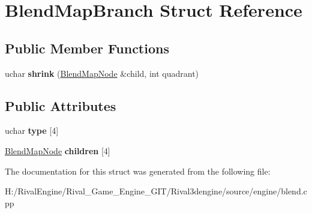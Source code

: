 \hypertarget{struct_blend_map_branch}{}\section{Blend\+Map\+Branch Struct Reference}
\label{struct_blend_map_branch}
\subsection*{Public Member Functions}
\begin{DoxyCompactItemize}
\item 
\mbox{\label{struct_blend_map_branch_a75f4b2252539a7d66896ecec864f5d8d}} 
uchar {\bfseries shrink} (\hyperlink{struct_blend_map_node}{Blend\+Map\+Node} \&child, int quadrant)
\end{DoxyCompactItemize}
\subsection*{Public Attributes}
\begin{DoxyCompactItemize}
\item 
\mbox{\label{struct_blend_map_branch_a93c415f30e5049732ca8eea9b0b1d60b}} 
uchar {\bfseries type} \mbox{[}4\mbox{]}
\item 
\mbox{\label{struct_blend_map_branch_af04ac5df68c681d57889e09b2518bf4b}} 
\hyperlink{struct_blend_map_node}{Blend\+Map\+Node} {\bfseries children} \mbox{[}4\mbox{]}
\end{DoxyCompactItemize}


The documentation for this struct was generated from the following file\+:\begin{DoxyCompactItemize}
\item 
H\+:/\+Rival\+Engine/\+Rival\+\_\+\+Game\+\_\+\+Engine\+\_\+\+G\+I\+T/\+Rival3dengine/source/engine/blend.\+cpp\end{DoxyCompactItemize}
